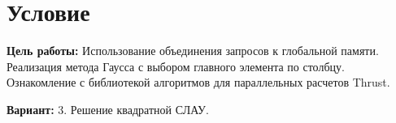 \section{Условие}
\textbf{Цель работы:} Использование объединения запросов к глобальной памяти. Реализация метода Гаусса с выбором главного элемента по столбцу. Ознакомление с библиотекой алгоритмов для параллельных расчетов Thrust.

\textbf{Вариант:} 3. Решение квадратной СЛАУ.
